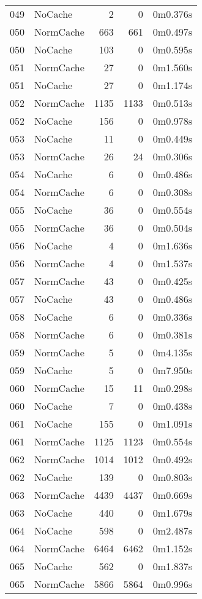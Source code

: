 \begin{tabular}{llrrl}
049 & NoCache & 2 & 0 & 0m0.376s \\
050 & NormCache & 663 & 661 & 0m0.497s \\
050 & NoCache & 103 & 0 & 0m0.595s \\
051 & NormCache & 27 & 0 & 0m1.560s \\
051 & NoCache & 27 & 0 & 0m1.174s \\
052 & NormCache & 1135 & 1133 & 0m0.513s \\
052 & NoCache & 156 & 0 & 0m0.978s \\
053 & NoCache & 11 & 0 & 0m0.449s \\
053 & NormCache & 26 & 24 & 0m0.306s \\
054 & NoCache & 6 & 0 & 0m0.486s \\
054 & NormCache & 6 & 0 & 0m0.308s \\
055 & NoCache & 36 & 0 & 0m0.554s \\
055 & NormCache & 36 & 0 & 0m0.504s \\
056 & NoCache & 4 & 0 & 0m1.636s \\
056 & NormCache & 4 & 0 & 0m1.537s \\
057 & NormCache & 43 & 0 & 0m0.425s \\
057 & NoCache & 43 & 0 & 0m0.486s \\
058 & NoCache & 6 & 0 & 0m0.336s \\
058 & NormCache & 6 & 0 & 0m0.381s \\
059 & NormCache & 5 & 0 & 0m4.135s \\
059 & NoCache & 5 & 0 & 0m7.950s \\
060 & NormCache & 15 & 11 & 0m0.298s \\
060 & NoCache & 7 & 0 & 0m0.438s \\
061 & NoCache & 155 & 0 & 0m1.091s \\
061 & NormCache & 1125 & 1123 & 0m0.554s \\
062 & NormCache & 1014 & 1012 & 0m0.492s \\
062 & NoCache & 139 & 0 & 0m0.803s \\
063 & NormCache & 4439 & 4437 & 0m0.669s \\
063 & NoCache & 440 & 0 & 0m1.679s \\
064 & NoCache & 598 & 0 & 0m2.487s \\
064 & NormCache & 6464 & 6462 & 0m1.152s \\
065 & NoCache & 562 & 0 & 0m1.837s \\
065 & NormCache & 5866 & 5864 & 0m0.996s \\

\end{tabular}
